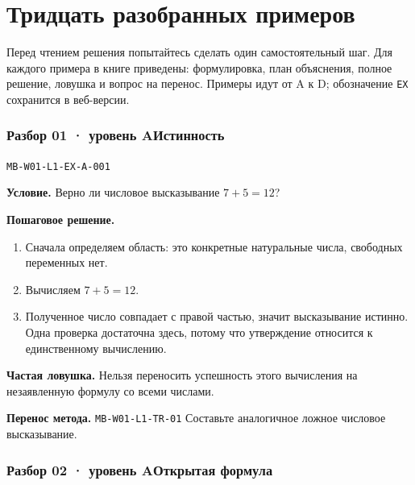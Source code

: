 \documentclass[11pt,a4paper,openany]{book}
\newcommand{\mtag}[1]{\textsf{\small\color{mbaccent}\bfseries #1}}
\newcommand{\muid}[1]{\texttt{\footnotesize #1}}
\begin{document}
\medskip

\chapter{Тридцать разобранных примеров}
\begin{keybox}
Перед чтением решения попытайтесь сделать один самостоятельный шаг. Для каждого примера в книге приведены: формулировка, план объяснения, полное решение, ловушка и вопрос на перенос. Примеры идут от A к D; обозначение \texttt{EX} сохранится в веб-версии.
\end{keybox}

\subsection*{\mtag{Разбор 01 · уровень A}\quad Истинность}\hypertarget{MB-W01-L1-EX-A-001}{}

\muid{MB-W01-L1-EX-A-001}\par

\begin{keybox}\textbf{Условие.} Верно ли числовое высказывание $7+5=12$?\end{keybox}

\textbf{Пошаговое решение.}\par
\begin{enumerate}[label=\arabic*),leftmargin=*,itemsep=3pt,topsep=4pt]
\item Сначала определяем область: это конкретные натуральные числа, свободных переменных нет.
\item Вычисляем $7+5=12$.
\item Полученное число совпадает с правой частью, значит высказывание истинно. Одна проверка достаточна здесь, потому что утверждение относится к единственному вычислению.
\end{enumerate}


\begin{learnbox}\textbf{Частая ловушка.} Нельзя переносить успешность этого вычисления на незаявленную формулу со всеми числами.\par \textbf{Перенос метода.} \muid{MB-W01-L1-TR-01} Составьте аналогичное ложное числовое высказывание.\end{learnbox}

\subsection*{\mtag{Разбор 02 · уровень A}\quad Открытая формула}\hypertarget{MB-W01-L1-EX-A-002}{}
\end{document}
